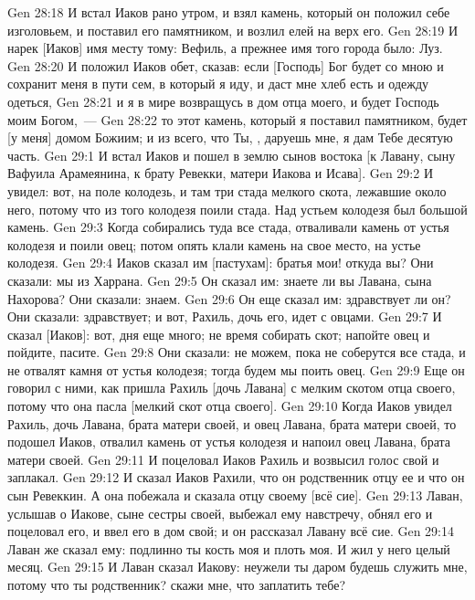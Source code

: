 \vs Gen 28:18 И встал Иаков рано утром, и взял камень, который он положил себе изголовьем, и поставил его памятником, и возлил елей на верх его.
\vs Gen 28:19 И нарек [Иаков] имя месту тому: Вефиль, а прежнее имя того города было: Луз.
\vs Gen 28:20 И положил Иаков обет, сказав: если [Господь] Бог будет со мною и сохранит меня в пути сем, в который я иду, и даст мне хлеб есть и одежду одеться,
\vs Gen 28:21 и я в мире возвращусь в дом отца моего, и будет Господь моим Богом,~---
\vs Gen 28:22 то этот камень, который я поставил памятником, будет [у меня] домом Божиим; и из всего, что Ты, , даруешь мне, я дам Тебе десятую часть.
\vs Gen 29:1 И встал Иаков и пошел в землю сынов востока [к Лавану, сыну Вафуила Арамеянина, к брату Ревекки, матери Иакова и Исава].
\vs Gen 29:2 И увидел: вот, на поле колодезь, и там три стада мелкого скота, лежавшие около него, потому что из того колодезя поили стада. Над устьем колодезя был большой камень.
\vs Gen 29:3 Когда собирались туда все стада, отваливали камень от устья колодезя и поили овец; потом опять клали камень на свое место, на устье колодезя.
\vs Gen 29:4 Иаков сказал им [пастухам]: братья мои! откуда вы? Они сказали: мы из Харрана.
\vs Gen 29:5 Он сказал им: знаете ли вы Лавана, сына Нахорова? Они сказали: знаем.
\vs Gen 29:6 Он еще сказал им: здравствует ли он? Они сказали: здравствует; и вот, Рахиль, дочь его, идет с овцами.
\vs Gen 29:7 И сказал [Иаков]: вот, дня еще много; не время собирать скот; напойте овец и пойдите, пасите.
\vs Gen 29:8 Они сказали: не можем, пока не соберутся все стада, и не отвалят камня от устья колодезя; тогда будем мы поить овец.
\vs Gen 29:9 Еще он говорил с ними, как пришла Рахиль [дочь Лавана] с мелким скотом отца своего, потому что она пасла [мелкий скот отца своего].
\vs Gen 29:10 Когда Иаков увидел Рахиль, дочь Лавана, брата матери своей, и овец Лавана, брата матери своей, то подошел Иаков, отвалил камень от устья колодезя и напоил овец Лавана, брата матери своей.
\vs Gen 29:11 И поцеловал Иаков Рахиль и возвысил голос свой и заплакал.
\vs Gen 29:12 И сказал Иаков Рахили, что он родственник отцу ее и что он сын Ревеккин. А она побежала и сказала отцу своему [всё сие].
\vs Gen 29:13 Лаван, услышав о Иакове, сыне сестры своей, выбежал ему навстречу, обнял его и поцеловал его, и ввел его в дом свой; и он рассказал Лавану всё сие.
\vs Gen 29:14 Лаван же сказал ему: подлинно ты кость моя и плоть моя. И жил у него  целый месяц.
\rsbpar\vs Gen 29:15 И Лаван сказал Иакову: неужели ты даром будешь служить мне, потому что ты родственник? скажи мне, что заплатить тебе?
